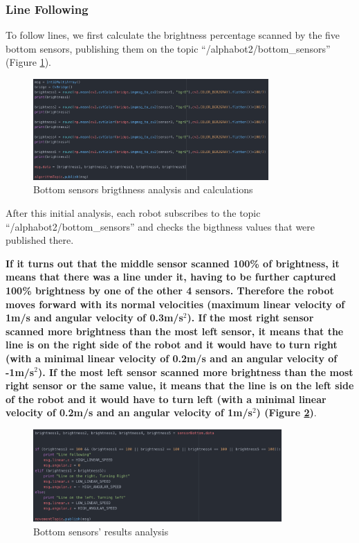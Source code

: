 \documentclass[conference]{IEEEtran}
\begin{document}
\subsubsection{Line Following} \label{line}

To follow lines, we first calculate the brightness percentage scanned by the five bottom sensors, publishing them on the topic ``/alphabot2/bottom\_sensors'' (Figure \ref{fig:fig12}).

\begin{figure}[H]
    \centering
    \includegraphics[width=9cm]{algorithm3.png}
    \caption{Bottom sensors brigthness analysis and calculations}
    \label{fig:fig12}
\end{figure}

After this initial analysis, each robot subscribes to the topic ``/alphabot2/bottom\_sensors'' and checks the bigthness values that were published there.

\textbf{If it turns out that the middle sensor scanned 100\% of brightness, it means that there was a line under it, having to be further captured 100\% brightness by one of the other 4 sensors. Therefore the robot moves forward with its normal velocities (maximum linear velocity of 1m/s and angular velocity of 0.3m/s$^{2}$). If the most right sensor scanned more brightness than the most left sensor, it means that the line is on the right side of the robot and it would have to turn right (with a minimal linear velocity of 0.2m/s and an angular velocity of -1m/s$^{2}$). If the most left sensor scanned more brightness than the most right sensor or the same value, it means that the line is on the left side of the robot and it would have to turn left (with a minimal linear velocity of 0.2m/s and an angular velocity of 1m/s$^{2}$) (Figure \ref{fig:fig13})}.

\begin{figure}[H]
    \centering
    \includegraphics[width=9.5cm]{algorithm4.png}
    \caption{Bottom sensors' results analysis}
    \label{fig:fig13}
\end{figure}
\end{document}
